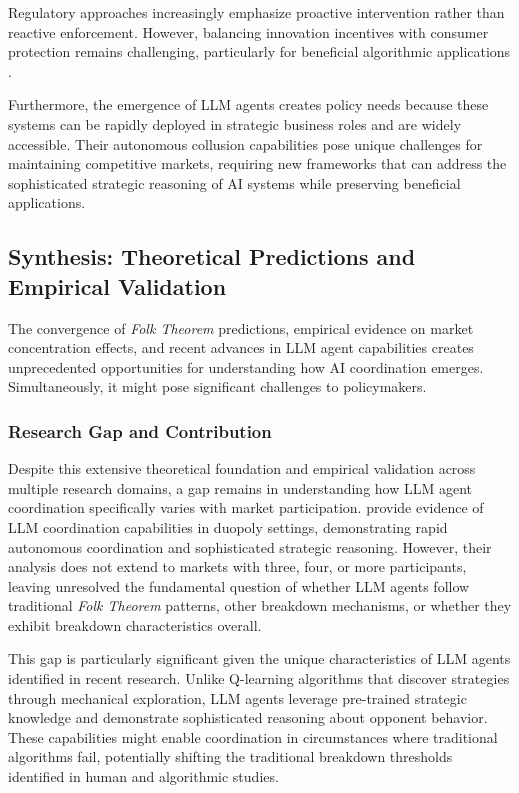 Regulatory approaches increasingly emphasize proactive intervention rather than reactive enforcement. However, balancing innovation incentives with consumer protection remains challenging, particularly for beneficial algorithmic applications \parencite{digital_regulation_cooperation_forum_auditing_2022}.

Furthermore, the emergence of LLM agents creates policy needs because these systems can be rapidly deployed in strategic business roles and are widely accessible. Their autonomous collusion capabilities pose unique challenges for maintaining competitive markets, requiring new frameworks that can address the sophisticated strategic reasoning of AI systems while preserving beneficial applications.

\subsection{Synthesis: Theoretical Predictions and Empirical Validation}

The convergence of \emph{Folk Theorem} predictions, empirical evidence on market concentration effects, and recent advances in LLM agent capabilities creates unprecedented opportunities for understanding how AI coordination emerges. Simultaneously, it might pose significant challenges to policymakers.

\subsubsection*{Research Gap and Contribution}

Despite this extensive theoretical foundation and empirical validation across multiple research domains, a gap remains in understanding how LLM agent coordination specifically varies with market participation. \textcite{fish_algorithmic_2025, lin_strategic_2025} provide evidence of LLM coordination capabilities in duopoly settings, demonstrating rapid autonomous coordination and sophisticated strategic reasoning. However, their analysis does not extend to markets with three, four, or more participants, leaving unresolved the fundamental question of whether LLM agents follow traditional \emph{Folk Theorem} patterns, other breakdown mechanisms, or whether they exhibit breakdown characteristics overall.

This gap is particularly significant given the unique characteristics of LLM agents identified in recent research. Unlike Q-learning algorithms that discover strategies through mechanical exploration, LLM agents leverage pre-trained strategic knowledge and demonstrate sophisticated reasoning about opponent behavior. These capabilities might enable coordination in circumstances where traditional algorithms fail, potentially shifting the traditional breakdown thresholds identified in human and algorithmic studies.

